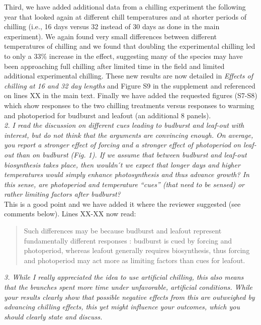 \documentclass[11pt,a4paper]{article}
\begin{document}
Third, we have added additional data from a chilling experiment the following year that looked again at different chill temperatures and at shorter periods of chilling (i.e., 16 days versus 32 instead of 30 days as done in the main experiment). We again found very small differences between different temperatures of chilling and we found that doubling the experimental chilling led to only a 33\% increase in the effect, suggesting many of the species may have been approaching full chilling after limited time in the field and limited additional experimental chilling. These new results are now detailed in \emph{Effects of chilling at 16 and 32 day lengths} and Figure S9 in the supplement and referenced on lines XX in the main text. Finally we have added the requested figures (S7-S8) which show responses to the two chilling treatments versus responses to warming and photoperiod for budburst and leafout (an additional 8 panels). \\

\emph{2.      I read the discussion on different cues leading to budburst and leaf-out with
interest, but do not think that the arguments are convincing enough. On average, you report a
stronger effect of forcing and a stronger effect of photoperiod on leaf-out than on budburst
(Fig. 1). If we assume that between budburst and leaf-out biosynthesis takes place, then
wouldn ́t we expect that longer days and higher temperatures would simply enhance
photosynthesis and thus advance growth? In this sense, are photoperiod and temperature “cues”
(that need to be sensed) or rather limiting factors after budburst?}\\

This is a good point and we have added it where the reviewer suggested (see comments below). Lines XX-XX now read:

\begin{quote}
Such differences may be because budburst and leafout represent fundamentally different responses \citep{Basler:2014aa}: budburst is cued by forcing and photoperiod, whereas leafout generally requires biosynthesis, thus forcing and photoperiod may act more as limiting factors than cues for leafout. 
\end{quote}

\emph{3.  While I really appreciated the idea to use artificial chilling, this also means that
the branches spent more time under unfavorable, artificial conditions. While your results
clearly show that possible negative effects from this are outweighed by advancing chilling
effects, this yet might influence your outcomes, which you should clearly state and discuss.}\\
\end{document}
